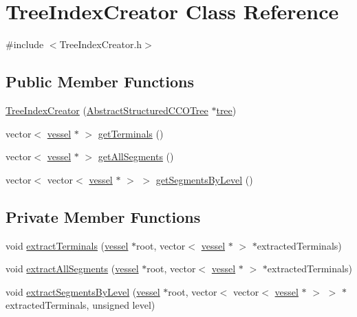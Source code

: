 \hypertarget{class_tree_index_creator}{}\section{Tree\+Index\+Creator Class Reference}
\label{class_tree_index_creator}


{\ttfamily \#include $<$Tree\+Index\+Creator.\+h$>$}

\subsection*{Public Member Functions}
\begin{DoxyCompactItemize}
\item 
\hyperlink{class_tree_index_creator_ad1a0863cd227cbe780c3effc04b88e23}{Tree\+Index\+Creator} (\hyperlink{class_abstract_structured_c_c_o_tree}{Abstract\+Structured\+C\+C\+O\+Tree} $\ast$\hyperlink{class_tree_index_creator_ac3046a68c0fee8e750fecb785d47b08e}{tree})
\item 
vector$<$ \hyperlink{structvessel}{vessel} $\ast$ $>$ \hyperlink{class_tree_index_creator_aaa96f17bfc82043b0ab3f78f9bdce9b5}{get\+Terminals} ()
\item 
vector$<$ \hyperlink{structvessel}{vessel} $\ast$ $>$ \hyperlink{class_tree_index_creator_aad7cac2dec20987a7099b1e62e5d89e9}{get\+All\+Segments} ()
\item 
vector$<$ vector$<$ \hyperlink{structvessel}{vessel} $\ast$ $>$ $>$ \hyperlink{class_tree_index_creator_a19b04a2a699a2dc613c7a8c1aef204b9}{get\+Segments\+By\+Level} ()
\end{DoxyCompactItemize}
\subsection*{Private Member Functions}
\begin{DoxyCompactItemize}
\item 
void \hyperlink{class_tree_index_creator_abb5e5caf92646f7b5ea4208ac8cec91c}{extract\+Terminals} (\hyperlink{structvessel}{vessel} $\ast$root, vector$<$ \hyperlink{structvessel}{vessel} $\ast$ $>$ $\ast$extracted\+Terminals)
\item 
void \hyperlink{class_tree_index_creator_a24896e87becf6b07f62e7335bf15a527}{extract\+All\+Segments} (\hyperlink{structvessel}{vessel} $\ast$root, vector$<$ \hyperlink{structvessel}{vessel} $\ast$ $>$ $\ast$extracted\+Terminals)
\item 
void \hyperlink{class_tree_index_creator_ac313beab57c3f74ae4ff4215950551d9}{extract\+Segments\+By\+Level} (\hyperlink{structvessel}{vessel} $\ast$root, vector$<$ vector$<$ \hyperlink{structvessel}{vessel} $\ast$ $>$ $>$ $\ast$extracted\+Terminals, unsigned level)
\end{DoxyCompactItemize}
